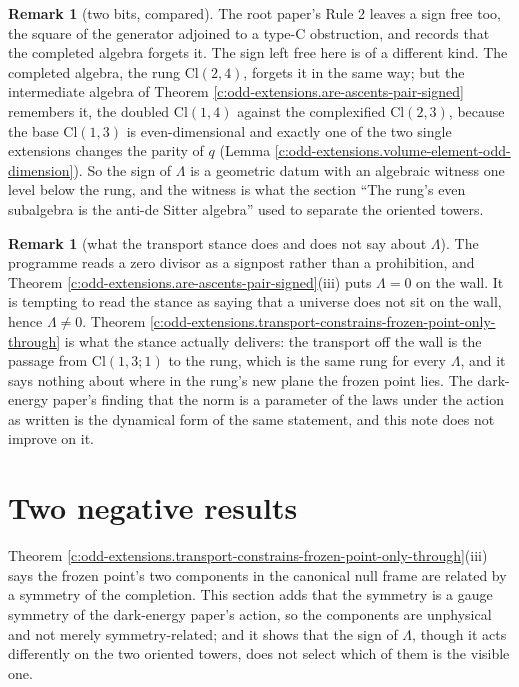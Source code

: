 \documentclass[11pt]{article}
\theoremstyle{definition}
\newtheorem{remark}[theorem]{Remark}
\theoremstyle{plain}
\providecommand{\Cl}{}\renewcommand{\Cl}{\mathrm{Cl}}
\begin{document}
\begin{remark}[two bits, compared]\label{c:note.odd-extensions.two-bits-compared}
The root paper's Rule 2 leaves a sign free too, the square of the generator adjoined to a type-C obstruction, and records that the completed algebra forgets it. The sign left free here is of a different kind. The completed algebra, the rung $\Cl(2,4)$, forgets it in the same way; but the intermediate algebra of Theorem \ref{c:odd-extensions.are-ascents-pair-signed} remembers it, the doubled $\Cl(1,4)$ against the complexified $\Cl(2,3)$, because the base $\Cl(1,3)$ is even-dimensional and exactly one of the two single extensions changes the parity of $q$ (Lemma \ref{c:odd-extensions.volume-element-odd-dimension}). So the sign of $\Lambda$ is a geometric datum with an algebraic witness one level below the rung, and the witness is what the section ``The rung's even subalgebra is the anti-de Sitter algebra'' used to separate the oriented towers.
\end{remark}

\begin{remark}[what the transport stance does and does not say about $\Lambda$]\label{c:note.odd-extensions.what-transport-stance-does-does-not}
The programme reads a zero divisor as a signpost rather than a prohibition, and Theorem \ref{c:odd-extensions.are-ascents-pair-signed}(iii) puts $\Lambda = 0$ on the wall. It is tempting to read the stance as saying that a universe does not sit on the wall, hence $\Lambda \neq 0$. Theorem \ref{c:odd-extensions.transport-constrains-frozen-point-only-through} is what the stance actually delivers: the transport off the wall is the passage from $\Cl(1,3;1)$ to the rung, which is the same rung for every $\Lambda$, and it says nothing about where in the rung's new plane the frozen point lies. The dark-energy paper's finding that the norm is a parameter of the laws under the action as written is the dynamical form of the same statement, and this note does not improve on it.
\end{remark}

\section{Two negative results}

\label{c:note.odd-extensions.setting-two-negative-results}
Theorem \ref{c:odd-extensions.transport-constrains-frozen-point-only-through}(iii) says the frozen point's two components in the canonical null frame are related by a symmetry of the completion. This section adds that the symmetry is a gauge symmetry of the dark-energy paper's action, so the components are unphysical and not merely symmetry-related; and it shows that the sign of $\Lambda$, though it acts differently on the two oriented towers, does not select which of them is the visible one.
\end{document}
